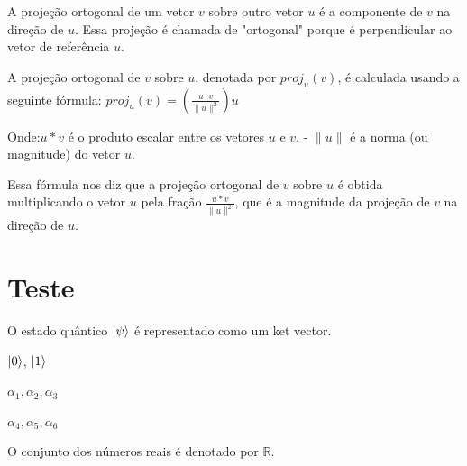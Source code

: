 \documentclass[12pt]{article}
\begin{document}
A projeção ortogonal de um vetor \(v\) sobre outro vetor \(u\) é a componente de \(v\) na direção de \(u\). Essa projeção é chamada de "ortogonal" porque é perpendicular ao vetor de referência \(u\).

A projeção ortogonal de \(v\) sobre \(u\), denotada por \(proj_{u}(v)\), é calculada usando a seguinte fórmula: \(proj_{u}(v) = \left( \frac{u \cdot v}{\|u\|^2} \right) u\)


Onde:\(u * v \) é o produto escalar entre os vetores \( u \) e \( v \).
- \( \| u \| \) é a norma (ou magnitude) do vetor \( u \).

Essa fórmula nos diz que a projeção ortogonal de \( v \) sobre \( u \) é obtida multiplicando o vetor \( u \) pela fração \(\frac{u*v}{\|u\|^2}\), que é a magnitude da projeção de \(v \) na direção de \(u\).




\section{Teste}

O estado quântico $\ket{\psi}$ é representado como um ket vector.

$\ket{0}$, $\ket{1}$

$\alpha_{1}, \alpha_{2}, \alpha_{3}$

\(\alpha_{4}, \alpha_{5}, \alpha_{6} \)

O conjunto dos números reais é denotado por $\mathbb{R}$.



\newpage

	
\end{document}
